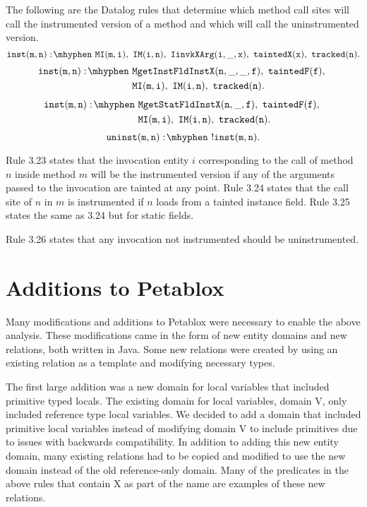 The following are the Datalog rules that determine which method call sites will call the instrumented version of a method and which will call the uninstrumented version.
\begin{equation}
  \mathtt{inst(m,n) \is MI(m,i) \also IM(i,n) \also IinvkXArg(i,\_,x) \also taintedX(x) \also tracked(n).}
\end{equation}
\begin{equation}
  \begin{split}
    \mathtt{inst(m,n) \is} & \mathtt{MgetInstFldInstX(n,\_,\_,f) \also taintedF(f) \also} \\
    & \mathtt{MI(m,i) \also IM(i,n) \also tracked(n).}
  \end{split}
\end{equation}
\begin{equation}
  \begin{split}
    \mathtt{inst(m,n) \is} & \mathtt{MgetStatFldInstX(n,\_,f) \also taintedF(f) \also} \\
    & \mathtt{MI(m,i) \also IM(i,n) \also tracked(n).}
  \end{split}
\end{equation}
\begin{equation}
  \mathtt{uninst(m,n) \is !inst(m,n).}
\end{equation}

Rule 3.23 states that the invocation entity $i$ corresponding to the call of method $n$ inside method $m$ will be the instrumented version if any of the arguments passed to the invocation are tainted at any point. Rule 3.24 states that the call site of $n$ in $m$ is instrumented if $n$ loads from a tainted instance field. Rule 3.25 states the same as 3.24 but for static fields.

Rule 3.26 states that any invocation not instrumented should be uninstrumented.
\section{Additions to Petablox}
Many modifications and additions to Petablox were necessary to enable the above analysis. These modifications came in the form of new entity domains and new relations, both written in Java. Some new relations were created by using an existing relation as a template and modifying necessary types. 

The first large addition was a new domain for local variables that included primitive typed locals. The existing domain for local variables, domain V, only included reference type local variables. We decided to add a domain that included primitive local variables instead of modifying domain V to include primitives due to issues with backwards compatibility. In addition to adding this new entity domain, many existing relations had to be copied and modified to use the new domain instead of the old reference-only domain. Many of the predicates in the above rules that contain X as part of the name are examples of these new relations. 

